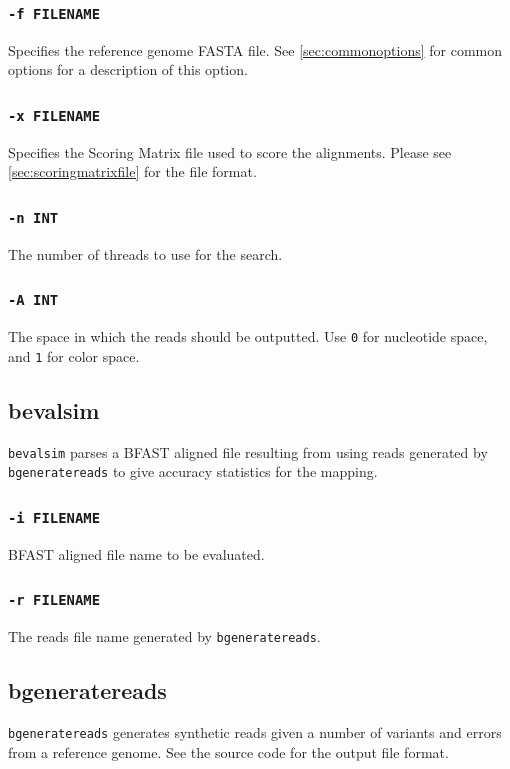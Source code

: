\documentclass[a4paper,12pt]{book}
\newcommand{\TT}[1]{{\tt #1}} %
\newcommand{\rGFF}{reference genome FASTA file}
\newcommand{\BAF}{BFAST aligned file} %
\begin{document}
\subsubsection{\TT{-f FILENAME}}
Specifies the \rGFF{}.
See \autoref{sec:commonoptions} for common options for a description of this option.

\subsubsection{\TT{-x FILENAME}}
Specifies the Scoring Matrix file used to score the alignments.
Please see \autoref{sec:scoringmatrixfile} for the file format.

\subsubsection{\TT{-n INT}}
The number of threads to use for the search.

\subsubsection{\TT{-A INT}}
The space in which the reads should be outputted.
Use \TT{0} for nucleotide space, and \TT{1} for color space.

\subsection{bevalsim}
\label{sec:bevalsim}
\TT{bevalsim} parses a \BAF{} resulting from using reads generated by \TT{bgeneratereads} to give accuracy statistics for the mapping.

\subsubsection{\TT{-i FILENAME}}
\BAF{} name to be evaluated.

\subsubsection{\TT{-r FILENAME}}
The reads file name generated by \TT{bgeneratereads}.

\subsection{bgeneratereads}
\label{sec:bgeneratereads}
\TT{bgeneratereads} generates synthetic reads given a number of variants and errors from a reference genome.
See the source code for the output file format.
\end{document}
